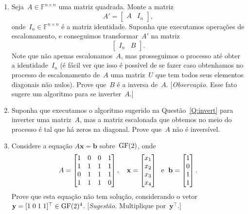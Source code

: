 \documentclass[11pt,reqno,a4paper]{amsart}
\def\FF{{\mathbb F}}
\def\bfb{\mathbf{b}}
\def\bfx{\mathbf{x}}
\def\bfy{\mathbf{y}}
\def\GF{\mathop{\rm GF}}
\newcommand\nlabelQ{\bf\upshape Q\arabic*}
\def\sugestao#1{[\textit{Sugestão.} #1]}
\let\hint\sugestao
\def\observacao#1{[\textit{Observação.} #1]}
\let\NB\observacao
\begin{document}
\begin{enumerate}[label=\nlabelQ]
\item\label{Q:invert} Seja~$A\in\FF^{n\times n}$ uma matriz quadrada.
  Monte a matriz
  \begin{equation}
    \label{eq:AI}
    A'=
    \begin{bmatrix}
      A&I_n
    \end{bmatrix},
  \end{equation}
  onde~$I_n\in\FF^{n\times n}$ é a matriz identidade.  Suponha que
  executamos operações de escalonamento, e conseguimos
  transformar~$A'$ na matriz
  \begin{equation}
    \label{eq:IA}
    \begin{bmatrix}
      I_n&B
    \end{bmatrix}.
  \end{equation}
  Note que não apenas escalonamos~$A$, mas prosseguimos o processo
  até obter a identidade~$I_n$ (é fácil ver que isso é possível de
  se fazer caso obtenhamos no processo de escalonamento de~$A$ uma
  matriz~$U$ que tem todos seus elementos diagonais não nulos).
  Prove que~$B$ é a inversa de~$A$.  \NB{Esse fato sugere um
    algoritmo para se inverter~$A$.}

\item Suponha que executamos o algoritmo sugerido na
  Questão~\ref{Q:invert} para inverter uma matriz~$A$, mas a matriz
  escalonada que obtemos no meio do processo é tal que há zeros na
  diagonal.  Prove que~$A$ não é inversível.
    
\item Considere a equação $A\bfx=\bfb$ sobre~$\GF(2)$, onde
  \begin{equation}
    \label{eq:3}
    A=
    \begin{bmatrix}
      1&0&0&1\\
      1&1&1&1\\
      0&1&1&1\\
      1&1&1&0
    \end{bmatrix},\quad
    \bfx=
    \begin{bmatrix}
      x_1\\
      x_2\\
      x_3\\
      x_4
    \end{bmatrix}\text{\; e \;}
    \bfb=
    \begin{bmatrix}
      1\\
      0\\
      1\\
      1
    \end{bmatrix}.    
  \end{equation}
  Prove que esta equação não tem solução, considerando o vetor
  $\bfy=[1\;0\;1\; 1]^\top\in\GF(2)^4$.  \hint{Multiplique
    por~$\bfy^\top$.}
  

\end{enumerate}
\end{document}
